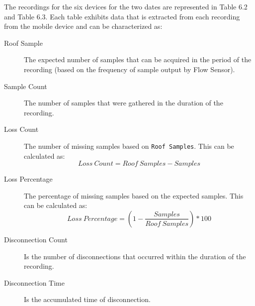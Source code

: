\begin{table}[!h]
\begin{center}
\caption{Day 2---Duration: 50 mins. \& Roof Samples: 4288}
\end{center}
\end{table}

The recordings for the six devices for the two dates are represented in Table 6.2 and Table 6.3. Each table exhibits data that is extracted from each recording from the mobile device and can be characterized as: 

\begin{description}
    \item[Roof Sample] The expected number of samples that can be acquired in the period of the recording (based on the frequency of sample output by Flow Sensor).
    \item[Sample Count] The number of samples that were gathered in the duration of the recording. 
    \item[Loss Count] The number of missing samples based on \verb|Roof Samples|. This can be calculated as: 
\begin{equation} \label{losscount}
Loss\ Count = Roof\ Samples - Samples
\end{equation}
    \item[Loss Percentage] The percentage of missing samples based on the expected samples. This can be calculated as:
\begin{equation} \label{losscount}
Loss\ Percentage = (1 - \frac{Samples}{Roof\ Samples}) * 100
\end{equation}
    \item[Disconnection Count] Is the number of disconnections that occurred within the duration of the recording.
    \item[Disconnection Time] Is the accumulated time of disconnection. 
\end{description}

